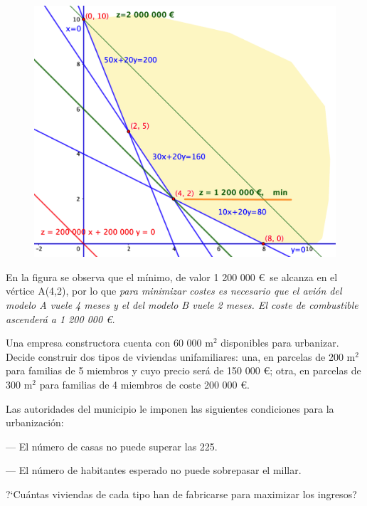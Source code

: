 \vspace{5mm}
	\begin{figure}[H] 	\centering
	\includegraphics[width=.75\textwidth]{imagenes/img47.png}
\end{figure}

\vspace{5mm} En la figura se observa que el mínimo, de valor 1 200 000 \euro$\,$ se  alcanza en el vértice A(4,2), por lo que \emph{para minimizar costes es necesario que el avión del modelo A vuele 4 meses y el del modelo B vuele 2 meses. El coste de combustible ascenderá a 1 200 000 \euro.}
	

	
	
\vspace{10mm}
\begin{ejemplo}
\begin{ejer}
	Una empresa constructora cuenta con 60 000 m$^2$ disponibles para urbanizar. Decide construir dos tipos de viviendas unifamiliares: una, en parcelas de 200 m$^2$ para familias de 5 miembros y cuyo precio será de 150 000 \euro; otra, en parcelas de 300 m$^2$ para familias de 4 miembros de coste 200 000 \euro.
	
	Las autoridades del municipio le imponen las siguientes condiciones para la urbanización:
	
	--- El número de casas no puede superar las 225.
	
	--- El número de habitantes esperado no puede sobrepasar el millar.
	
	?`Cuántas viviendas de cada tipo han de fabricarse para maximizar los ingresos?
	
\end{ejer}	
\end{ejemplo}


